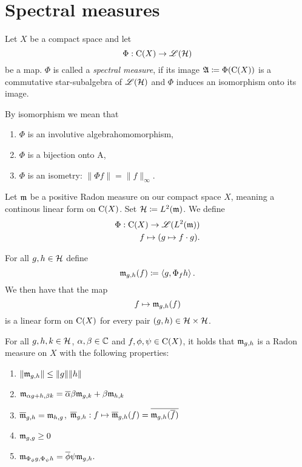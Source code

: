 
\section{Spectral measures}

\begin{defi}
 
 Let $X$ be a compact space and let
 \[
  \Phi : \operatorname{C} (X) \to \mathscr{L}(\mathcal{H})
 \]
be a map. $\Phi$ is called a \textit{spectral measure}, if its image 
$\mathfrak{A} \coloneqq \Phi(\operatorname{C} (X))$ is a commutative star-subalgebra of $\mathscr{L}(\mathcal{H})$ and 
$\Phi$ induces an isomorphism onto its image.
\end{defi}

\begin{rem}
 By isomorphism we mean that
 \begin{enumerate}
  \item $\Phi$ is an involutive algebrahomomorphism,
  \item $\Phi$ is a bijection onto A,
  \item $\Phi$ is an isometry: $\| \Phi f \| = \| f \|_\infty$.
 \end{enumerate}

\end{rem}


Let $\mathfrak{m}$ be a positive Radon measure on our compact space $X$, meaning a
continous linear form on $\operatorname{C} (X)$. Set $\mathcal{H} \coloneqq L^2(\mathfrak{m})$. We define 
\begin{align*}
 \Phi : \operatorname{C}(X) \to \mathscr{L}({L^2(\mathfrak{m})}) \\
 f \mapsto (g \mapsto f\cdot g).
\end{align*}

For all $g , h \in \mathcal{H}$ define
\[
 \mathfrak{m}_{g, h} (f) \coloneqq \left\langle g, \Phi_f h \right\rangle.
\]
We then have that the map 
\[
 f \mapsto \mathfrak{m}_{g,h} (f)
\]
is a linear form on $\operatorname{C} (X)$ for every pair $(g, h) \in \mathcal{H} \times \mathcal{H}$.

\begin{thrm}
For all $g, h,k \in \mathcal{H}$, $\alpha, \beta \in \mathbb{C}$ and $f, \phi, \psi \in \operatorname{C}(X)$,
it holds that $\mathfrak{m}_{g,h}$ is a Radon measure on $X$ with the following properties:
\begin{enumerate}[{(}i{)}]
 \item $\| \mathfrak{m}_{g,h}\| \leq \|g\| \|h\|$
 \item $\mathfrak{m}_{\alpha g + h, \beta k} = \overline{\alpha}\beta \mathfrak{m}_{g,k} + 
 \beta \mathfrak{m}_{h,k}$
 \item $\overline{\mathfrak{m}}_{g,h} = \mathfrak{m}_{h,g}$, $\overline{\mathfrak{m}}_{g,h} : 
 f \mapsto \overline{\mathfrak{m}}_{g,h}(f) = \overline{\mathfrak{m}_{g,h}(\overline{f})}$
 \item $\mathfrak{m}_{g,g} \geq 0$
 \item $\mathfrak{m}_{\Phi_\phi g, \Phi_\psi h} = \overline{\phi} \psi \mathfrak{m}_{g,h}.$
\end{enumerate}

\end{thrm}

